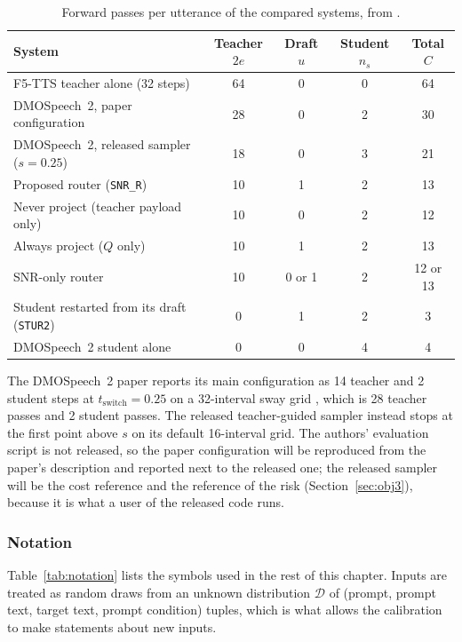 \begin{table}[!htbp]
\centering\small
\caption{Forward passes per utterance of the compared systems, from .}
\label{tab:cost}
\begin{tabular}{@{}>{\raggedright\arraybackslash}p{5.6cm} c c c c@{}}
\toprule
\textbf{System} & \textbf{Teacher $2e$} & \textbf{Draft $u$} & \textbf{Student $n_s$} & \textbf{Total $C$} \\
\midrule
F5-TTS teacher alone (32 steps) & 64 & 0 & 0 & 64 \\
DMOSpeech~2, paper configuration & 28 & 0 & 2 & 30 \\
DMOSpeech~2, released sampler ($s=0.25$) & 18 & 0 & 3 & 21 \\
Proposed router (\texttt{SNR\_R}) & 10 & 1 & 2 & 13 \\
Never project (teacher payload only) & 10 & 0 & 2 & 12 \\
Always project ($Q$ only) & 10 & 1 & 2 & 13 \\
SNR-only router & 10 & 0 or 1 & 2 & 12 or 13 \\
Student restarted from its draft (\texttt{STUR2}) & 0 & 1 & 2 & 3 \\
DMOSpeech~2 student alone & 0 & 0 & 4 & 4 \\
\bottomrule
\end{tabular}
\end{table}

\begin{remark}\label{rem:grid}
The DMOSpeech~2 paper reports its main configuration as 14 teacher and 2 student steps at $t_{\text{switch}}=0.25$ on a 32-interval sway grid \parencite{li2025dmospeech2}, which is 28 teacher passes and 2 student passes. The released teacher-guided sampler instead stops at the first point above $s$ on its default 16-interval grid. The authors' evaluation script is not released, so the paper configuration will be reproduced from the paper's description and reported next to the released one; the released sampler will be the cost reference and the reference of the risk (Section~\ref{sec:obj3}), because it is what a user of the released code runs.
\end{remark}

\subsubsection{Notation}
Table~\ref{tab:notation} lists the symbols used in the rest of this chapter. Inputs are treated as random draws from an unknown distribution $\mathcal{D}$ of (prompt, prompt text, target text, prompt condition) tuples, which is what allows the calibration to make statements about new inputs.

